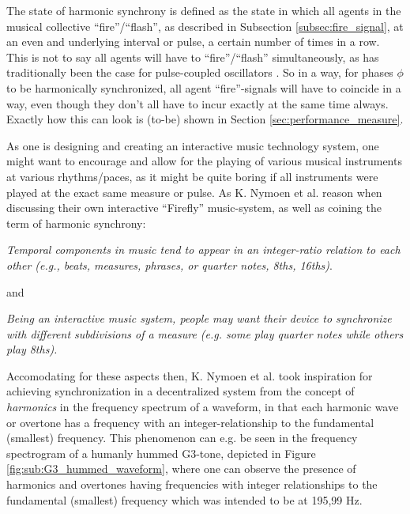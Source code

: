 The state of harmonic synchrony is defined as the state in which all agents in the musical collective ``fire''/``flash'', as described in Subsection \ref{subsec:fire_signal}, at an even and underlying interval or pulse, a certain number of times in a row. This is not to say all agents will have to ``fire''/``flash'' simultaneously, as has traditionally been the case for pulse-coupled oscillators \cite{}. So in a way, for phases $\phi$ to be harmonically synchronized, all agent ``fire''-signals will have to coincide in a way, even though they don't all have to incur exactly at the same time always. Exactly how this can look is (to-be) shown in Section \ref{sec:performance_measure}.

As one is designing and creating an interactive music technology system, one might want to encourage and allow for the playing of various musical instruments at various rhythms/paces, as it might be quite boring if all instruments were played at the exact same measure or pulse. As K. Nymoen et al. \cite{nymoen_synch} reason when discussing their own interactive ``Firefly'' music-system, as well as coining the term of harmonic synchrony: \nl

\textit{Temporal components in music tend to appear in an integer-ratio relation to each other (e.g., beats, measures, phrases, or quarter notes, 8ths, 16ths)}. \nl

and \nl

\textit{Being an interactive music system, people may want their device to synchronize with different subdivisions of a measure (e.g. some play quarter notes while others play 8ths).} \nl

Accomodating for these aspects then, K. Nymoen et al. took inspiration for achieving synchronization in a decentralized system from the concept of \textit{harmonics} in the frequency spectrum of a waveform, in that each harmonic wave or overtone has a frequency with an integer-relationship to the fundamental (smallest) frequency. This phenomenon can e.g. be seen in the frequency spectrogram of a humanly hummed G3-tone, depicted in Figure \ref{fig:sub:G3_hummed_waveform}, where one can observe the presence of harmonics and overtones having frequencies with integer relationships to the fundamental (smallest) frequency which was intended to be at 195,99 Hz.

